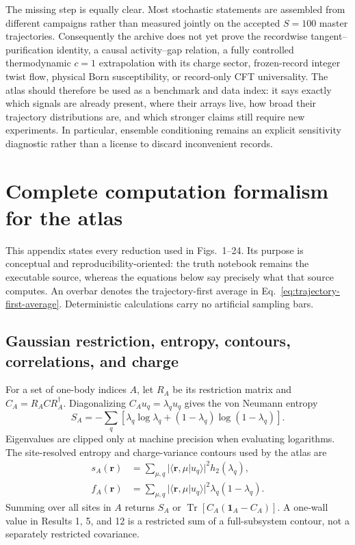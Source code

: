 \documentclass[aps,prb,twocolumn,floatfix,nofootinbib,superscriptaddress]{revtex4-2}
\newcommand{\Tr}{\operatorname{Tr}}
\begin{document}
The missing step is equally clear.  Most stochastic statements are assembled from
different campaigns rather than measured jointly on the accepted $S=100$ master
trajectories.  Consequently the archive does not yet prove the recordwise
tangent--purification identity, a causal activity--gap relation, a fully controlled
thermodynamic $c=1$ extrapolation with its charge sector, frozen-record integer twist flow,
physical Born susceptibility, or record-only CFT universality.  The atlas should therefore
be used as a benchmark and data index: it says exactly which signals are already present,
where their arrays live, how broad their trajectory distributions are, and which stronger
claims still require new experiments.  In particular, ensemble conditioning remains an
explicit sensitivity diagnostic rather than a license to discard inconvenient records.

\appendix

\section{Complete computation formalism for the atlas}
\label{app:formalism}

This appendix states every reduction used in Figs.~1--24.  Its purpose is conceptual and
reproducibility-oriented: the truth notebook remains the executable source, whereas the
equations below say precisely what that source computes.  An overbar denotes the
trajectory-first average in Eq.~\eqref{eq:trajectory-first-average}.  Deterministic
calculations carry no artificial sampling bars.

\subsection{Gaussian restriction, entropy, contours, correlations, and charge}
\label{app:gaussian-formalism}

For a set of one-body indices $A$, let $R_A$ be its restriction matrix and
$C_A=R_ACR_A^\dagger$.  Diagonalizing $C_Au_q=\lambda_qu_q$ gives the von Neumann
entropy~\cite{Peschel2003}
\begin{equation}
 S_A=-\sum_q\left[\lambda_q\log\lambda_q+
 (1-\lambda_q)\log(1-\lambda_q)\right].
 \label{eq:atlas-entropy}
\end{equation}
Eigenvalues are clipped only at machine precision when evaluating logarithms.  The
site-resolved entropy and charge-variance contours used by the atlas are
\begin{equation}
 \begin{aligned}
 s_A(\boldsymbol r)&=\sum_{\mu,q}
 |\langle\boldsymbol r,\mu|u_q\rangle|^2h_2(\lambda_q),\\
 f_A(\boldsymbol r)&=\sum_{\mu,q}
 |\langle\boldsymbol r,\mu|u_q\rangle|^2\lambda_q(1-\lambda_q).
 \end{aligned}
 \label{eq:atlas-contours}
\end{equation}
Summing over all sites in $A$ returns $S_A$ or
$\Tr[C_A(\mathbf{1}_A-C_A)]$.  A one-wall value in Results 1, 5, and 12 is a restricted
sum of a full-subsystem contour, not a separately restricted covariance.
\end{document}
